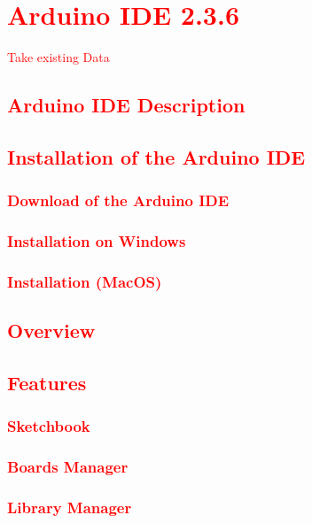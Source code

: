 \chapter{\textcolor{red}{Arduino IDE 2.3.6}}
\textcolor{red}{Take existing Data}

\section{\textcolor{red}{Arduino IDE Description}}

\section{\textcolor{red}{Installation of the Arduino IDE}}

\subsection{\textcolor{red}{Download of the Arduino IDE}}

\subsection{\textcolor{red}{Installation on Windows}}

\subsection{\textcolor{red}{Installation (MacOS)}}

\section{\textcolor{red}{Overview}}

\section{\textcolor{red}{Features}}

\subsection{\textcolor{red}{Sketchbook}}

\subsection{\textcolor{red}{Boards Manager}}

\subsection{\textcolor{red}{Library Manager}}

